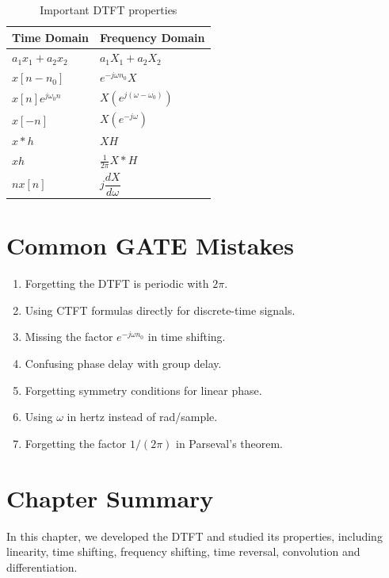\begin{table}[H]
\centering
\caption{Important DTFT properties}
\begin{tabular}{|p{5cm}|p{6cm}|}
\hline
\textbf{Time Domain} & \textbf{Frequency Domain}\\
\hline
\(a_1x_1+a_2x_2\) & \(a_1X_1+a_2X_2\)\\
\hline
\(x[n-n_0]\) & \(e^{-j\omega n_0}X\)\\
\hline
\(x[n]e^{j\omega_0 n}\) & \(X(e^{j(\omega-\omega_0)})\)\\
\hline
\(x[-n]\) & \(X(e^{-j\omega})\)\\
\hline
\(x*h\) & \(XH\)\\
\hline
\(xh\) & \(\frac{1}{2\pi}X*H\)\\
\hline
\(nx[n]\) & \(j\dfrac{dX}{d\omega}\)\\
\hline
\end{tabular}
\end{table}


\section{Common GATE Mistakes}

\begin{enumerate}
\item Forgetting the DTFT is periodic with \(2\pi\).
\item Using CTFT formulas directly for discrete-time signals.
\item Missing the factor \(e^{-j\omega n_0}\) in time shifting.
\item Confusing phase delay with group delay.
\item Forgetting symmetry conditions for linear phase.
\item Using \(\omega\) in hertz instead of rad/sample.
\item Forgetting the factor \(1/(2\pi)\) in Parseval’s theorem.
\end{enumerate}


\section{Chapter Summary}

In this chapter, we developed the DTFT and studied its properties, including
linearity, time shifting, frequency shifting, time reversal, convolution and
differentiation.

